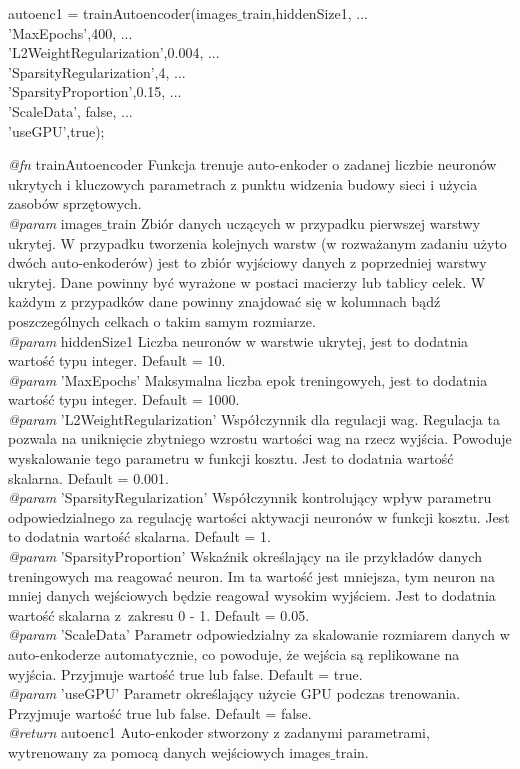 \noindent autoenc1 = trainAutoencoder(images$\_$train,hiddenSize1, ...
\\ \indent   'MaxEpochs',400, ...
\\ \indent   'L2WeightRegularization',0.004, ...
\\ \indent   'SparsityRegularization',4, ...
\\ \indent   'SparsityProportion',0.15, ...
\\ \indent   'ScaleData', false, ...
\\ \indent   'useGPU',true);
\vspace{1cm}

\noindent \textit{@fn} trainAutoencoder Funkcja trenuje auto-enkoder o zadanej liczbie neuronów ukrytych i kluczowych parametrach z punktu widzenia budowy sieci i użycia zasobów sprzętowych.
\\ \textit{@param} images$\_$train Zbiór danych uczących w przypadku pierwszej warstwy ukrytej. W przypadku tworzenia kolejnych warstw (w rozważanym zadaniu użyto dwóch auto-enkoderów) jest to zbiór wyjściowy danych z poprzedniej warstwy ukrytej. Dane powinny być wyrażone w postaci macierzy lub tablicy celek. W każdym z przypadków dane powinny znajdować się w kolumnach bądź poszczególnych celkach o takim samym rozmiarze.
\\ \textit{@param} hiddenSize1 Liczba neuronów w warstwie ukrytej, jest to dodatnia wartość typu integer. Default = 10.
\\ \textit{@param} 'MaxEpochs' Maksymalna liczba epok treningowych, jest to dodatnia wartość typu integer. Default = 1000.
\\ \textit{@param} 'L2WeightRegularization' Współczynnik dla regulacji wag. Regulacja ta pozwala na uniknięcie zbytniego wzrostu wartości wag na rzecz wyjścia. Powoduje wyskalowanie tego parametru w funkcji kosztu. Jest to dodatnia wartość skalarna. Default = 0.001.
\\ \textit{@param} 'SparsityRegularization' Współczynnik kontrolujący wpływ parametru odpowiedzialnego za regulację wartości aktywacji neuronów w funkcji kosztu. Jest to dodatnia wartość skalarna. Default = 1.
\\ \textit{@param} 'SparsityProportion' Wskaźnik określający na ile przykładów danych treningowych ma reagować neuron. Im ta wartość jest mniejsza, tym neuron na mniej danych wejściowych będzie reagował wysokim wyjściem. Jest to dodatnia wartość skalarna z~zakresu 0 - 1. Default = 0.05.
\\ \textit{@param} 'ScaleData' Parametr odpowiedzialny za skalowanie rozmiarem danych w auto-enkoderze automatycznie, co powoduje, że wejścia są replikowane na wyjścia. Przyjmuje wartość true lub false. Default = true.
\\ \textit{@param} 'useGPU' Parametr określający użycie GPU podczas trenowania. Przyjmuje wartość true lub false. Default = false.
\\ \textit{@return} autoenc1 Auto-enkoder stworzony z zadanymi parametrami, wytrenowany za pomocą danych wejściowych images$\_$train.

